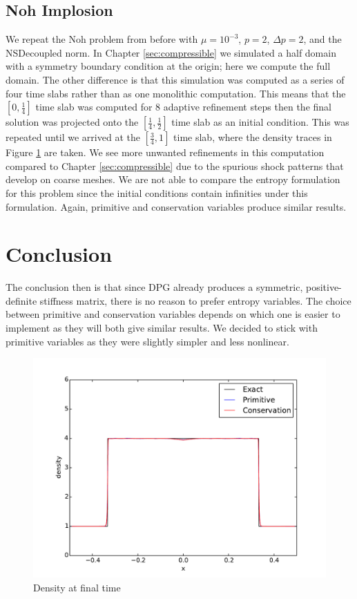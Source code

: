 \documentclass[Dissertation.tex]{subfiles}
\begin{document}
\subsection{Noh Implosion}
We repeat the Noh problem from before with $\mu=10^{-3}$, $p=2$, $\Delta p=2$, and the NSDecoupled norm.
In Chapter \ref{sec:compressible} we simulated a half domain with a symmetry boundary condition
at the origin; here we compute the full domain.
The other difference is that this simulation was computed as a series of four time slabs 
rather than as one monolithic computation.
This means that the $[0,\frac{1}{4}]$ time slab was computed for 8 adaptive refinement steps
then the final solution was projected onto the $[\frac{1}{4},\frac{1}{2}]$ time slab as an 
initial condition.
This was repeated until we arrived at the $[\frac{3}{4},1]$ time slab, where the density traces
in Figure \ref{fig:NohDen} are taken.
We see more unwanted refinements in this computation compared to Chapter \ref{sec:compressible}
due to the spurious shock patterns that develop on coarse meshes.
We are not able to compare the entropy formulation for this problem since the initial conditions 
contain infinities under this formulation.
Again, primitive and conservation variables produce similar results.

\section{Conclusion}
The conclusion then is that since DPG already produces a symmetric, positive-definite stiffness
matrix, there is no reason to prefer entropy variables.
The choice between primitive and conservation variables depends on which one
is easier to implement as they will both give similar results.
We decided to stick with primitive variables as they were slightly simpler and
less nonlinear.

\begin{figure}[ht]
\centering
\includegraphics[width=\textwidth]{Noh/FormulationComparison/den9.pdf}
\caption{Density at final time}
\label{fig:NohDen}
\end{figure}
\end{document}
